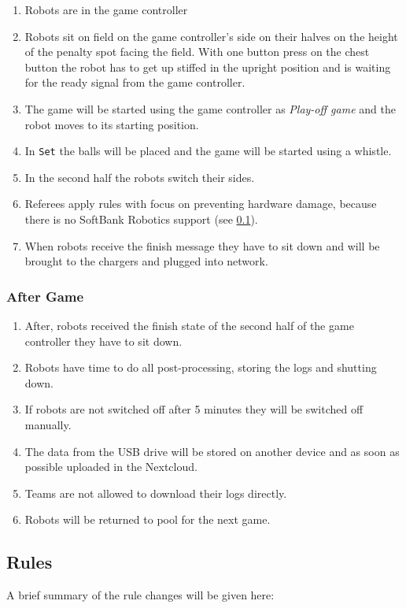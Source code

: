 	\begin{enumerate}
		\item Robots are in the game controller
		\item Robots sit on field on the game controller's side on their halves on the height of the penalty spot facing the field. With one button press on the chest button the robot has to get up stiffed in the upright position and is waiting for the ready signal from the game controller.
		\item The game will be started using the game controller as \textit{Play-off game} and the robot moves to its starting position.
		\item In \texttt{Set} the balls will be placed and the game will be started using a whistle.
		\item In the second half the robots switch their sides.
		\item Referees apply rules with focus on preventing hardware damage, because there is no SoftBank Robotics support (see \ref{sec:rules_ref}).
		\item When robots receive the finish message they have to sit down and will be brought to the chargers and plugged into network.
	\end{enumerate}
	
\subsubsection{After Game}
	
	\begin{enumerate}
		\item After, robots received the finish state of the second half of the game controller they have to sit down.
		\item Robots have time to do all post-processing, storing the logs and shutting down.
		\item If robots are not switched off after 5 minutes they will be switched off manually.
		\item The data from the USB drive will be stored on another device and as soon as possible uploaded in the Nextcloud.
		\item Teams are not allowed to download their logs directly.
		\item Robots will be returned to pool for the next game.
	\end{enumerate}


\subsection{Rules}
\label{sec:rules_ref}
A brief summary of the rule changes will be given here:

